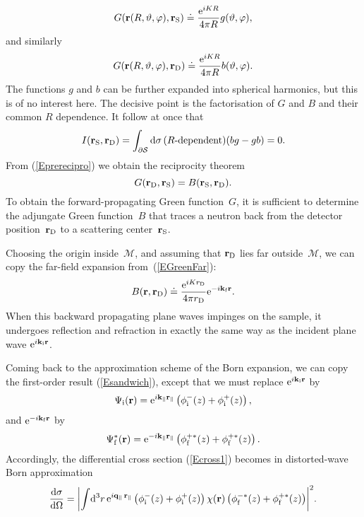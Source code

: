 \begin{equation}
   G(\mathbf{r}(R,\vartheta,\varphi),\mathbf{r}_{\rm S})
   \doteq \frac{{\rm e}^{iKR}}{4\pi R} g(\vartheta,\varphi),
\end{equation}
and similarly 
\begin{equation}
   G(\mathbf{r}(R,\vartheta,\varphi),\mathbf{r}_{\rm D})
   \doteq \frac{{\rm e}^{iKR}}{4\pi R} b(\vartheta,\varphi).
\end{equation}
The functions $g$ and $b$ can be further expanded into spherical harmonics,
but this is of no interest here.
The decisive point is the factorisation of $G$ and $B$
and their common $R$ dependence.
It follow at once that
\begin{equation}
  I(\mathbf{r}_{\rm S},\mathbf{r}_{\rm D})
  =\displaystyle\int_{\partial\mathcal{S}}{\rm d}\sigma\,
       (\text{$R$-dependent})(bg-gb)
  = 0.
\end{equation}
From (\ref{Eprerecipro}) we obtain the reciprocity theorem
\begin{equation}
  G(\mathbf{r}_{\rm D},\mathbf{r}_{\rm S}) = B(\mathbf{r}_{\rm S},\mathbf{r}_{\rm D}).
\end{equation}
To obtain the forward-propagating Green function~$G$,
it is sufficient to determine the adjungate Green function~$B$
that traces a neutron back from the detector position~$\mathbf{r}_{\rm D}$
to a scattering center~$\mathbf{r}_{\rm S}$.

Choosing the origin inside~$\mathcal{M}$, 
and assuming that $\mathbf{r}_{\rm D}$ lies far outside~$\mathcal{M}$,
we can copy the far-field expansion from~(\ref{EGreenFar}):
\begin{equation}\label{EGreenFar}
  B(\mathbf{r},\mathbf{r}_{\rm D})
  \doteq\frac{{\rm e}^{iKr_{\rm D}}}{4\pi r_{\rm D}}{\rm e}^{-i\mathbf{k}_{\rm f} \mathbf{r}}.
\end{equation}
When this backward propagating plane waves impinges on the sample,
it undergoes reflection and refraction in exactly the same way as
the incident plane wave ${\rm e}^{i\mathbf{k}_{\rm i}\mathbf{r}}$.

Coming back to the approximation scheme of the Born expansion,
we can copy the first-order result (\ref{Esandwich}),
except that we must replace ${\rm e}^{i\mathbf{k}_{\rm i}\mathbf{r}}$ by
\begin{equation}
  \Psi_{\rm i}(\mathbf{r})
   = {\rm e}^{i \mathbf{k}_\parallel \mathbf{r}_\parallel}
     \left(\phi^-_{\rm i}(z) + \phi^+_{\rm i}(z)\right),
\end{equation}
and ${\rm e}^{-i\mathbf{k}_{\rm f}\mathbf{r}}$ by
\begin{equation}
  \Psi_{\rm f}^*(\mathbf{r})
   = {\rm e}^{-i \mathbf{k}_\parallel \mathbf{r}_\parallel}
     \left(\phi^{+*}_{\rm f}(z) + \phi^{+*}_{\rm f}(z)\right).
\end{equation}
Accordingly, the differential cross section (\ref{Ecross1}) becomes
in distorted-wave Born approximation
\begin{equation}\label{Ecross2}
  \frac{{\rm d}\sigma}{{\rm d}\Omega}
  = {\left|
    \int\!{\rm d}^3r\, {\rm e}^{i\mathbf{q}_\parallel\,\mathbf{r}_\parallel}
    \left(\phi^-_{\rm i}(z) + \phi^+_{\rm i}(z)\right)
    \chi(\mathbf{r})
    \left(\phi^{-*}_{\rm f}(z) + \phi^{+*}_{\rm f}(z)\right)
    \right|}^2.
\end{equation}


